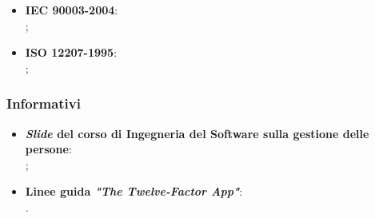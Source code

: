 \begin{itemize}
	\item \textbf{ IEC 90003-2004}: \\
		  ;
	\item \textbf{ISO 12207-1995}: \\
		  ;
\end{itemize}

\subsubsection{Informativi}
\begin{itemize}
	\item \textbf{\textit{Slide} del corso di Ingegneria del Software sulla gestione delle persone}: \\
 	  ;
	\item \textbf{Linee guida \textit{"The Twelve-Factor App"}}: \\
		  .
\end{itemize}

\newpage
